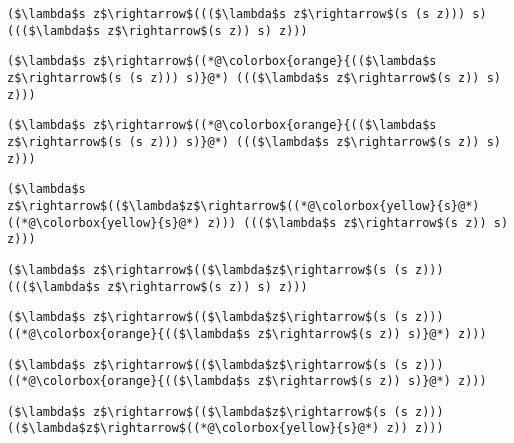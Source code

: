 \documentclass{beamer}
\begin{document}
\begin{frame}[fragile]{\CurrentSection}
\lstset{basicstyle=\ttfamily\small}\lstset{numbers=none}\lstset{language=ML}\begin{lstlisting}
($\lambda$s z$\rightarrow$((($\lambda$s z$\rightarrow$(s (s z))) s) ((($\lambda$s z$\rightarrow$(s z)) s) z)))
\end{lstlisting}
\pause\lstset{language=ML}\begin{lstlisting}
($\lambda$s z$\rightarrow$((*@\colorbox{orange}{(($\lambda$s z$\rightarrow$(s (s z))) s)}@*) ((($\lambda$s z$\rightarrow$(s z)) s) z)))
\end{lstlisting}

\end{frame}

\begin{frame}[fragile]{\CurrentSection}
\lstset{basicstyle=\ttfamily\small}\lstset{numbers=none}\lstset{language=ML}\begin{lstlisting}
($\lambda$s z$\rightarrow$((*@\colorbox{orange}{(($\lambda$s z$\rightarrow$(s (s z))) s)}@*) ((($\lambda$s z$\rightarrow$(s z)) s) z)))
\end{lstlisting}
\pause\lstset{language=ML}\begin{lstlisting}
($\lambda$s z$\rightarrow$(($\lambda$z$\rightarrow$((*@\colorbox{yellow}{s}@*) ((*@\colorbox{yellow}{s}@*) z))) ((($\lambda$s z$\rightarrow$(s z)) s) z)))
\end{lstlisting}

\end{frame}

\begin{frame}[fragile]{\CurrentSection}
\lstset{basicstyle=\ttfamily\small}\lstset{numbers=none}\lstset{language=ML}\begin{lstlisting}
($\lambda$s z$\rightarrow$(($\lambda$z$\rightarrow$(s (s z))) ((($\lambda$s z$\rightarrow$(s z)) s) z)))
\end{lstlisting}
\pause\lstset{language=ML}\begin{lstlisting}
($\lambda$s z$\rightarrow$(($\lambda$z$\rightarrow$(s (s z))) ((*@\colorbox{orange}{(($\lambda$s z$\rightarrow$(s z)) s)}@*) z)))
\end{lstlisting}

\end{frame}

\begin{frame}[fragile]{\CurrentSection}
\lstset{basicstyle=\ttfamily\small}\lstset{numbers=none}\lstset{language=ML}\begin{lstlisting}
($\lambda$s z$\rightarrow$(($\lambda$z$\rightarrow$(s (s z))) ((*@\colorbox{orange}{(($\lambda$s z$\rightarrow$(s z)) s)}@*) z)))
\end{lstlisting}
\pause\lstset{language=ML}\begin{lstlisting}
($\lambda$s z$\rightarrow$(($\lambda$z$\rightarrow$(s (s z))) (($\lambda$z$\rightarrow$((*@\colorbox{yellow}{s}@*) z)) z)))
\end{lstlisting}

\end{frame}
\end{document}
